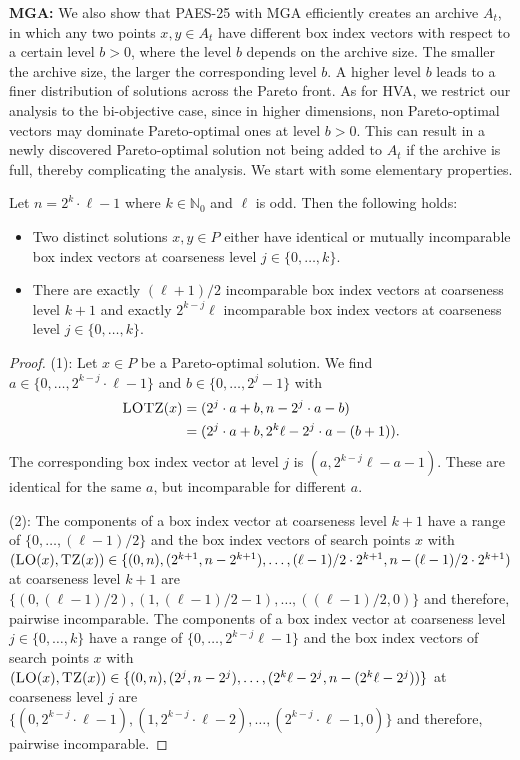 \documentclass[
sigconf = false, %
review = false, %
screen = true, %
anonymous = true, %
format=acmsmall
]{acmart}
\newcommand{\LOTZ}{\textsc{LOTZ}\xspace}
\newcommand{\LO}{\textsc{LO}\xspace}                      %
\newcommand{\TZ}{\textsc{TZ}\xspace}
\newcommand{\PAES}{PAES-25\xspace}
\begin{document}
\textbf{MGA:} We also show that \PAES with MGA efficiently creates an archive $A_t$, in which any two points $x,y \in A_t$ have different box index vectors with respect to a certain level $b>0$, where the level $b$ depends on the archive size. The smaller the archive size, the larger the corresponding level $b$. A higher level $b$ leads to a finer distribution of solutions across the Pareto front. As for HVA, we restrict our analysis to the bi-objective case, since in higher dimensions, non Pareto-optimal vectors may dominate Pareto-optimal ones at level $b>0$. This can result in a newly discovered Pareto-optimal solution not being added to $A_t$ if the archive is full, thereby complicating the analysis. We start with some elementary properties.

\begin{lemma}
\label{lem:different-coarseness-properties}
Let $n=2^k \cdot \ell-1$ where $k \in \mathbb{N}_0$ and $\ell$ is odd. Then the following holds:
\begin{itemize}
\item[(1)] Two distinct solutions $x,y \in P$ either have identical or mutually incomparable box index vectors at coarseness level $j \in \{0, \ldots , k\}$.
\item[(2)] There are exactly $(\ell+1)/2$ incomparable box index vectors at coarseness level $k+1$ and exactly $2^{k-j}\ell$ incomparable box index vectors at coarseness level $j \in \{0, \ldots , k\}$.
\end{itemize}
\end{lemma}

\begin{proof}
(1): Let $x \in P$ be a Pareto-optimal solution. We find $a \in \{0, \ldots , 2^{k-j} \cdot \ell-1\}$ and $b \in \{0, \ldots , 2^j-1\}$ with 
  \begin{align*}
  \LOTZ(x)&=(2^j \cdot a + b,n-2^j \cdot a-b) \\
  &= (2^j \cdot a + b,2^k \ell-2^j \cdot a-(b+1)).
  \end{align*}
The corresponding box index vector at level $j$ is $(a,2^{k-j}\ell-a-1)$. These are identical for the same $a$, but incomparable for different $a$.

(2): The components of a box index vector at coarseness level $k+1$ have a range of $\{0, \ldots , (\ell-1)/2\}$  and the box index vectors of search points $x$ with $(\LO(x),\TZ(x)) \in \{(0,n), (2^{k+1},n-2^{k+1}), \ldots, (\ell-1)/2 \cdot 2^{k+1},n-(\ell-1)/2 \cdot 2^{k+1})$ at coarseness level $k+1$ are $\{(0,(\ell-1)/2),(1,(\ell-1)/2-1), \ldots , ((\ell-1)/2,0)\}$ and therefore, pairwise incomparable. The components of a box index vector at coarseness level $j \in \{0, \ldots , k\}$ have a range of $\{0, \ldots , 2^{k-j}\ell-1\}$ and the box index vectors of search points $x$ with $(\LO(x),\TZ(x)) \in \{(0,n), (2^j,n-2^j), \ldots, (2^k\ell - 2^j, n - (2^k\ell - 2^j))\}$ at coarseness level $j$ are $\{(0,2^{k-j} \cdot \ell-1),(1,2^{k-j} \cdot \ell-2), \ldots , (2^{k-j} \cdot \ell-1,0)\}$ and therefore, pairwise incomparable.
\end{proof}
\end{document}
